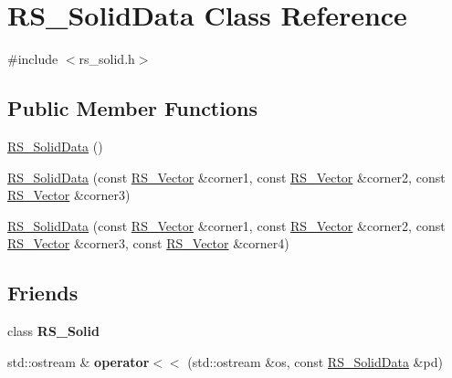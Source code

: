 \hypertarget{classRS__SolidData}{\section{R\-S\-\_\-\-Solid\-Data Class Reference}
\label{classRS__SolidData}
}


{\ttfamily \#include $<$rs\-\_\-solid.\-h$>$}

\subsection*{Public Member Functions}
\begin{DoxyCompactItemize}
\item 
\hyperlink{classRS__SolidData_a8bf04c7df3f3b91a990b93b8f76da6f3}{R\-S\-\_\-\-Solid\-Data} ()
\item 
\hyperlink{classRS__SolidData_a9b889a8fd71d6e2bd0eb09e947a10f66}{R\-S\-\_\-\-Solid\-Data} (const \hyperlink{classRS__Vector}{R\-S\-\_\-\-Vector} \&corner1, const \hyperlink{classRS__Vector}{R\-S\-\_\-\-Vector} \&corner2, const \hyperlink{classRS__Vector}{R\-S\-\_\-\-Vector} \&corner3)
\item 
\hyperlink{classRS__SolidData_abd9a9a07b1669a53ba1f806b840557ab}{R\-S\-\_\-\-Solid\-Data} (const \hyperlink{classRS__Vector}{R\-S\-\_\-\-Vector} \&corner1, const \hyperlink{classRS__Vector}{R\-S\-\_\-\-Vector} \&corner2, const \hyperlink{classRS__Vector}{R\-S\-\_\-\-Vector} \&corner3, const \hyperlink{classRS__Vector}{R\-S\-\_\-\-Vector} \&corner4)
\end{DoxyCompactItemize}
\subsection*{Friends}
\begin{DoxyCompactItemize}
\item 
\hypertarget{classRS__SolidData_a3102c67245dc6f85e8e7958e3a334623}{class {\bfseries R\-S\-\_\-\-Solid}}\label{classRS__SolidData_a3102c67245dc6f85e8e7958e3a334623}

\item 
\hypertarget{classRS__SolidData_aa6e128986e7004f5c5995186a0afde7e}{std\-::ostream \& {\bfseries operator$<$$<$} (std\-::ostream \&os, const \hyperlink{classRS__SolidData}{R\-S\-\_\-\-Solid\-Data} \&pd)}\label{classRS__SolidData_aa6e128986e7004f5c5995186a0afde7e}

\end{DoxyCompactItemize}


